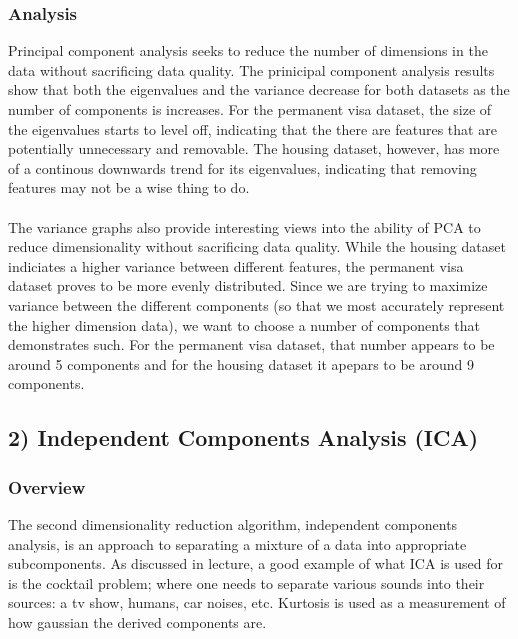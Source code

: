 \documentclass[h]{article}
\begin{document}
\subsubsection*{Analysis}
Principal component analysis seeks to reduce the number of dimensions in the data without sacrificing data quality.  The prinicipal component analysis results show that both the eigenvalues and the variance decrease for 
both datasets as the number of components is increases.  For the permanent visa 
dataset, the size of the eigenvalues starts to level off, indicating that the 
there are features that are potentially unnecessary and removable.  The housing 
dataset, however, has more of a continous downwards trend for its eigenvalues, 
indicating that removing features may not be a wise thing to do.
\\ \\
The variance graphs also provide interesting views into the ability of PCA to reduce 
dimensionality without sacrificing data quality.  While the housing dataset 
indiciates a higher variance between different features, the permanent visa 
dataset proves to be more evenly distributed.  Since we are trying to maximize 
variance between the different components (so that we most accurately represent the higher dimension 
data), we want to choose a number of components that demonstrates such.  For 
the permanent visa dataset, that number appears to be around 5 components and for 
the housing dataset it apepars to be around 9 components.

\subsection*{2) Independent Components Analysis (ICA)}  
\subsubsection*{Overview}
The second dimensionality reduction algorithm, independent components analysis, 
is an approach to separating a mixture of a data into appropriate subcomponents. 
 As discussed in lecture, a good example of what ICA is used for is the cocktail problem; where one needs to 
 separate various sounds into their sources: a tv show, humans, car noises, etc.  
  Kurtosis is used as a measurement of how gaussian the derived components 
  are.
  
\end{document}

